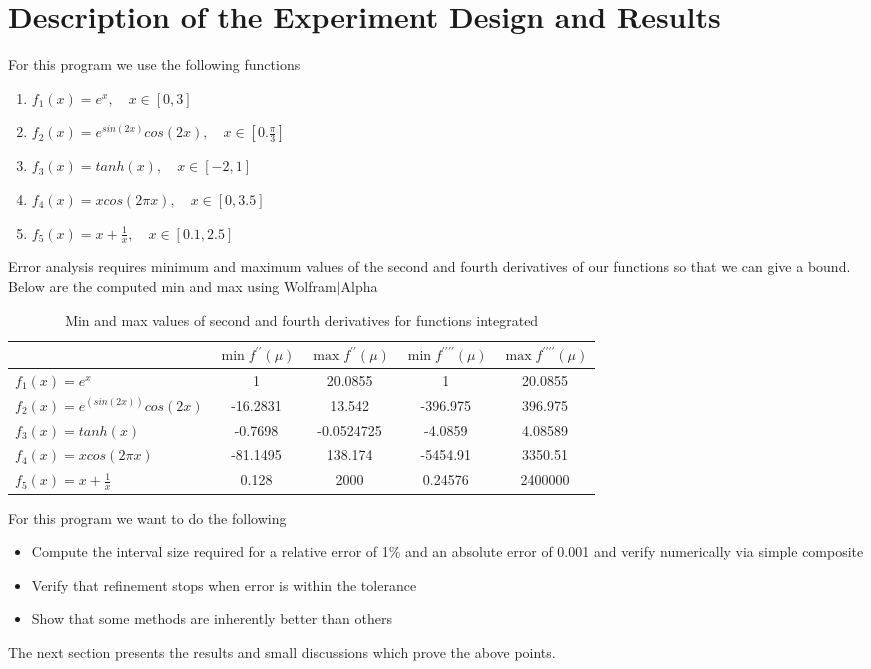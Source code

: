 \documentclass[12pt]{article}
\theoremstyle{remark}
\begin{document}
\newpage

\section{Description of the Experiment Design and Results}

For this program we use the following functions
\begin{enumerate}
	\item $f_1(x) = e^x, \quad x \in [0,3]$
	\item $f_2(x) = e^{sin(2x)}cos(2x), \quad x \in [0. \frac{\pi}{3}]$
	\item $f_3(x) = tanh(x), \quad x \in [-2,1]$ 
	\item $f_4(x) = xcos(2\pi x), \quad x \in [0,3.5]$
	\item $f_5(x) = x + \frac{1}{x}, \quad x \in [0.1, 2.5]$
\end{enumerate}

Error analysis requires minimum and maximum values of the second and fourth derivatives of our functions so that we can give a bound. Below are the computed min and max using Wolfram$|$Alpha

\begin{table}[H]
	\centering
	\begin{tabular}{||l|c|c|c|c||}
		\cline{2-5}
		\multicolumn{1}{c|}{} & $\min f^{\prime\prime}(\mu)$ & $\max f^{\prime\prime}(\mu)$ & $\min f^{\prime\prime\prime\prime}(\mu)$ & $\max f^{\prime\prime\prime\prime}(\mu)$ \\
		\hline \hline
		$f_1(x) = e^x$ & 1 & 20.0855 & 1 & 20.0855 \\ \hline
		$f_2(x) = e^{(sin(2x))}cos(2x)$ & -16.2831 & 13.542 & -396.975 & 396.975 \\ \hline
		$f_3(x) = tanh(x)$ & -0.7698 & -0.0524725 & -4.0859 & 4.08589 \\ \hline
		$f_4(x) = xcos(2\pi x)$ & -81.1495 & 138.174 & -5454.91 & 3350.51 \\ \hline
		$f_5(x) = x + \frac{1}{x}$ & 0.128 & 2000 & 0.24576 & 2400000 \\ \hline
	\end{tabular}
	\caption{Min and max values of second and fourth derivatives for functions integrated}
\end{table}

For this program we want to do the following
\begin{itemize}
	\item Compute the interval size required for a relative error of 1\% and an absolute error of 0.001 and verify numerically via simple composite
	\item Verify that refinement stops when error is within the tolerance
	\item Show that some methods are inherently better than others
\end{itemize}
The next section presents the results and small discussions which prove the above points.
\end{document}
